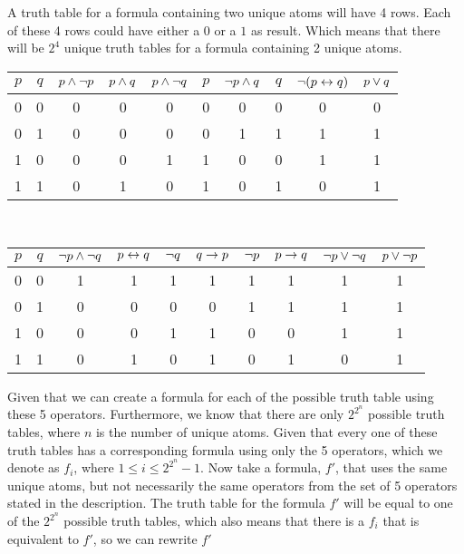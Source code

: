 \begin{solutions}
\setcounter{solutioncounter}{9}
\solution
\spart
A truth table for a formula containing two unique atoms will have 4 rows. Each of these 4 rows could have either a $0$ or a $1$ as result. Which means that there will be $2^4$ unique truth tables for a formula containing 2 unique atoms.
\spart
\begin{tabular}{cc | cccccccc}
	\toprule
	$p$& $q$&
	$p \wedge \lnot p$&
	$p \wedge q$&
	$p \wedge \lnot q$&
	$p$&
	$\lnot p \wedge q$&
	$q$&
	$\lnot(p \leftrightarrow q)$&
	$p \vee q$
	\\
	\midrule
	\strut 
	0& 0&  0& 0& 0& 0& 0& 0& 0& 0\\
	0& 1&  0& 0& 0& 0& 1& 1& 1& 1\\
	1& 0&  0& 0& 1& 1& 0& 0& 1& 1\\
	1& 1&  0& 1& 0& 1& 0& 1& 0& 1\\
	\bottomrule
\end{tabular}
\\
\begin{tabular}{cc | cccccccc}
	\toprule
	$p$& $q$&
	$\lnot p \wedge \lnot q$&
	$p \leftrightarrow q$&
	$\lnot q$&
	$q \rightarrow p$&
	$\lnot p$&
	$p \rightarrow q$&
	$\lnot p \vee \lnot q $&
	$p \vee \lnot p$
	\\
	\midrule
	\strut 
	0& 0&  1& 1& 1& 1& 1& 1& 1& 1\\
	0& 1&  0& 0& 0& 0& 1& 1& 1& 1\\
	1& 0&  0& 0& 1& 1& 0& 0& 1& 1\\
	1& 1&  0& 1& 0& 1& 0& 1& 0& 1\\
	\bottomrule
\end{tabular}
\spart
Given that we can create a formula for each of the possible truth table using these 5 operators. Furthermore, we know that there are only $2^{2^{n}}$ possible truth tables, where $n$ is the number of unique atoms. Given that every one of these truth tables has a corresponding formula using only the 5 operators, which we denote as $f_i$, where $1 \leq i \leq 2^{2^{n}} - 1$. Now take a formula, $f'$, that uses the same unique atoms, but not necessarily the same operators from the set of 5 operators stated in the description. The truth table for the formula $f'$ will be equal to one of the $2^{2^{n}}$ possible truth tables, which also means that there is a $f_i$ that is equivalent to $f'$, so we can rewrite $f'$


\end{solutions}
